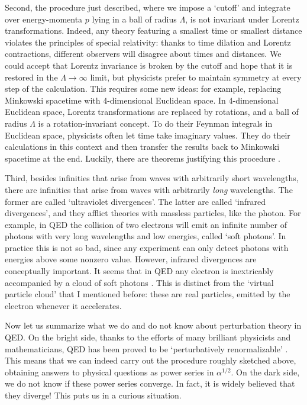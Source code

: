 \documentclass[12pt]{article}
\begin{document}
Second, the procedure just described, where we impose a `cutoff' and integrate over energy-momenta $p$ lying in a ball of radius $\Lambda$, is not invariant under Lorentz transformations.   Indeed, any theory featuring a smallest time or smallest distance violates the principles of special relativity: thanks to time dilation and Lorentz contractions, different observers will disagree about times and distances.  We could accept that Lorentz invariance is broken by the cutoff and hope that it is restored in the $\Lambda \to \infty$ limit, but physicists prefer to maintain symmetry at every step of the calculation.  This requires some new ideas: for example, replacing Minkowski spacetime with 4-dimensional Euclidean space.  In 4-dimensional Euclidean space, Lorentz transformations are replaced by rotations, and a ball of radius $\Lambda$ is a rotation-invariant concept.   To do their Feynman integrals in Euclidean space, physicists often let time take imaginary values.  They do their calculations in this context and then transfer the results back to Minkowski spacetime at the end.   Luckily, there are theorems justifying this procedure \cite{GlimmJaffe, Haag, StreaterWightman}.

Third, besides infinities that arise from waves with arbitrarily short wavelengths, there are infinities that arise from waves with arbitrarily \emph{long} wavelengths.   The former are called `ultraviolet divergences'.  The latter are called `infrared divergences', and they afflict theories with massless particles, like the photon.  For example, in QED the collision of two electrons will emit an infinite number of photons with very long wavelengths and low energies, called `soft photons'.  In practice this is not so bad, since any experiment can only detect photons with energies above some nonzero value.   However, infrared divergences are conceptually important.  It seems that in QED any electron is inextricably accompanied by a cloud of soft photons \cite{Buchholz}.   This is distinct from the `virtual particle cloud' that I mentioned before: these are real particles, emitted by the electron whenever it accelerates.

Now let us summarize what we do and do not know about perturbation theory in QED.  On the bright side, thanks to the efforts of many brilliant physicists and mathematicians, QED has been proved to be `perturbatively renormalizable' \cite{FHRW,Scharf}.  This means that we can indeed carry out the procedure roughly sketched above, obtaining answers to physical questions as power series in $\alpha^{1/2}$.  On the dark side, we do not know if these power series converge.   In fact, it is widely believed that they diverge!   This puts us in a curious situation.  
\end{document}
